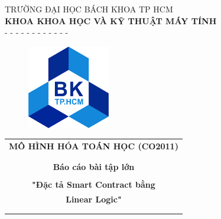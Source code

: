 \documentclass[12pt,a4paper,oneside]{article}
\begin{document}
		\thispagestyle{empty}
	\begin{titlepage}
					\thispagestyle{empty}
		\vspace{0cm}
		\begin{center}
			TRƯỜNG ĐẠI HỌC BÁCH KHOA TP HCM \\
			\textbf{KHOA KHOA HỌC VÀ KỸ THUẬT MÁY TÍNH } \\
			- - - - - - - - - - - -
		\end{center}
		
		
		\vspace{1cm}
		\begin{figure}[h!]
			\begin{center}
				\includegraphics[width=3.6cm]{Images/hcmut.png}
			\end{center}
		\end{figure}
		\vspace{1cm}
		
		
		
	\begin{center}
	\begin{tabular}{c}
		\multicolumn{1}{c}{\textbf{{\huge MÔ HÌNH HÓA TOÁN HỌC (CO2011)}}}\\
		\\ \hline \\
		\textbf{{\Large Báo cáo bài tập lớn}}\\
		\\
		\textbf{{\Huge "Đặc tả Smart Contract bằng}}\\
		\textbf{{\Huge Linear Logic"}}\\
		\\ \hline \\
	\end{tabular}
\end{center}




\end{titlepage}
\end{document}
